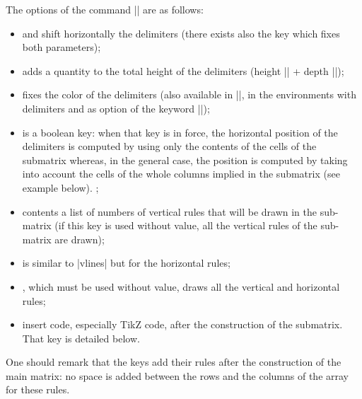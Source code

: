 \documentclass[dvipsnames]{article}
\begin{document}
\bigskip
The options of the command |\SubMatrix| are as follows:
\begin{itemize}
\item 
{}
 and  shift
horizontally the delimiters (there exists also the key 
which fixes both parameters);
\item {}
 adds a quantity to the total height of the
delimiters (height |\ht| + depth |\dp|);
\item {}
 fixes the color of the delimiters (also
available in |\NiceMatrixOptions|, in the environments with delimiters and as
option of the keyword |\CodeAfter|);
\item {}
 is a boolean key: when that key is in force, the horizontal
position of the delimiters is computed by using only the contents of the cells
of the submatrix whereas, in the general case, the position is computed by
taking into account the cells of the whole columns implied in the submatrix
(see example below). ;
\item {}
 contents a list of numbers of vertical rules that
will be drawn in the sub-matrix (if this key is used without value, all the
vertical rules of the sub-matrix are drawn);
\item {}
 is similar to |vlines| but for the horizontal rules;
\item {}
, which must be used without value, draws all the
vertical and horizontal rules;
\item {}
 insert code, especially TikZ code, after the
construction of the submatrix. That key is detailed below.
\end{itemize}
One should remark that the keys add their rules after the construction of
the main matrix: no space is added between the rows and the columns of the
array for these rules.
\end{document}
